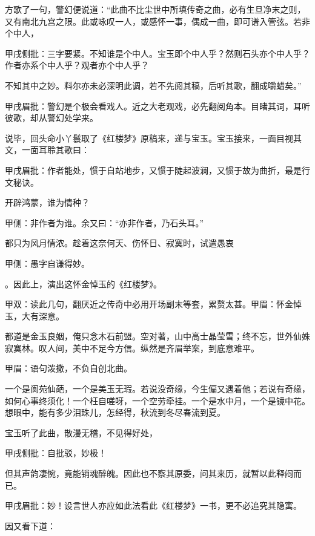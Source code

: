 \begin{parag}
    方歌了一句，警幻便说道：“此曲不比尘世中所填传奇之曲，必有生旦净末之则，又有南北九宫之限。此或咏叹一人，或感怀一事，偶成一曲，即可谱入管弦。若非个中人，\begin{note}甲戌侧批：三字要紧。不知谁是个中人。宝玉即个中人乎？然则石头亦个中人乎？作者亦系个中人乎？观者亦个中人乎？\end{note}不知其中之妙。料尔亦未必深明此调，若不先阅其稿，后听其歌，翻成嚼蜡矣。”\begin{note}甲戌眉批：警幻是个极会看戏人。近之大老观戏，必先翻阅角本。目睹其词，耳听彼歌，却从警幻处学来。\end{note}说毕，回头命小丫鬟取了《红楼梦》原稿来，递与宝玉。宝玉接来，一面目视其文，一面耳聆其歌曰：\begin{note}甲戌眉批：作者能处，惯于自站地步，又惯于陡起波澜，又惯于故为曲折，最是行文秘诀。\end{note}
\end{parag}


\begin{qute}
    开辟鸿蒙，谁为情种？\begin{note}甲侧：非作者为谁。余又曰：“亦非作者，乃石头耳。”\end{note}都只为风月情浓。趁着这奈何天、伤怀日、寂寞时，试遣愚衷\begin{note}甲侧：愚字自谦得妙。\end{note}。因此上，演出这怀金悼玉的《红楼梦》。\begin{note}甲双：读此几句，翻厌近之传奇中必用开场副末等套，累赘太甚。甲眉：怀金悼玉，大有深意。\end{note}
\end{qute}


\begin{qute}
    都道是金玉良姻，俺只念木石前盟。空对著，山中高士晶莹雪；终不忘，世外仙姝寂寞林。叹人间，美中不足今方信。纵然是齐眉举案，到底意难平。\begin{note}甲眉：语句泼撒，不负自创北曲。\end{note}
\end{qute}


\begin{qute}
    一个是阆苑仙葩，一个是美玉无瑕。若说没奇缘，今生偏又遇着他；若说有奇缘，如何心事终须化！一个枉自嗟呀，一个空劳牵挂。一个是水中月，一个是镜中花。想眼中，能有多少泪珠儿，怎经得，秋流到冬尽春流到夏。
\end{qute}


\begin{parag}
    宝玉听了此曲，散漫无稽，不见得好处，\begin{note}甲戌侧批：自批驳，妙极！\end{note}但其声韵凄惋，竟能销魂醉魄。因此也不察其原委，问其来历，就暂以此释闷而已。\begin{note}甲戌眉批：妙！设言世人亦应如此法看此《红楼梦》一书，更不必追究其隐寓。\end{note}因又看下道：
\end{parag}


